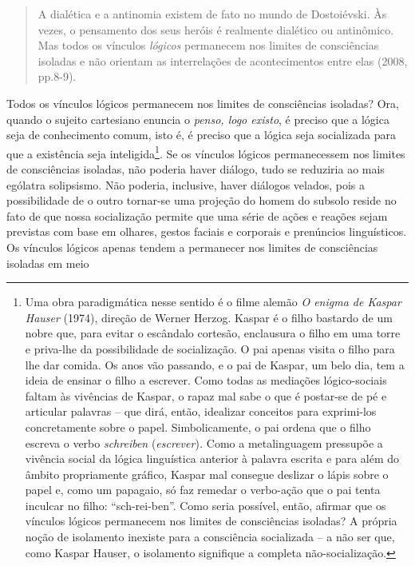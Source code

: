\begin{quote}
A dialética e a antinomia existem de fato no mundo de Dostoiévski. Às
vezes, o pensamento dos seus heróis é realmente dialético ou antinômico.
Mas todos os vínculos \emph{lógicos} permanecem nos limites de
consciências isoladas e não orientam as interrelações de acontecimentos
entre elas (2008, pp.8-9).
\end{quote}

Todos os vínculos lógicos permanecem nos limites de consciências
isoladas? Ora, quando o sujeito cartesiano enuncia o \emph{penso, logo
existo}, é preciso que a lógica seja de conhecimento comum, isto é, é
preciso que a lógica seja socializada para que a existência seja
inteligida\footnote{Uma obra paradigmática nesse sentido é o filme
  alemão \emph{O enigma de Kaspar Hauser} (1974), direção de Werner
  Herzog. Kaspar é o filho bastardo de um nobre que, para evitar o
  escândalo cortesão, enclausura o filho em uma torre e priva-lhe da
  possibilidade de socialização. O pai apenas visita o filho para lhe
  dar comida. Os anos vão passando, e o pai de Kaspar, um belo dia, tem
  a ideia de ensinar o filho a escrever. Como todas as mediações
  lógico-sociais faltam às vivências de Kaspar, o rapaz mal sabe o que é
  postar-se de pé e articular palavras -- que dirá, então, idealizar
  conceitos para exprimi-los concretamente sobre o papel.
  Simbolicamente, o pai ordena que o filho escreva o verbo
  \emph{schreiben} (\emph{escrever})\emph{.} Como a metalinguagem
  pressupõe a vivência social da lógica linguística anterior à palavra
  escrita e para além do âmbito propriamente gráfico, Kaspar mal
  consegue deslizar o lápis sobre o papel e, como um papagaio, só faz
  remedar o verbo-ação que o pai tenta inculcar no filho:
  ``sch-rei-ben''. Como seria possível, então, afirmar que os vínculos
  lógicos permanecem nos limites de consciências isoladas? A própria
  noção de isolamento inexiste para a consciência socializada -- a não
  ser que, como Kaspar Hauser, o isolamento signifique a completa
  não-socialização.}. Se os vínculos lógicos permanecessem nos limites
de consciências isoladas, não poderia haver diálogo, tudo se reduziria
ao mais ególatra solipsismo. Não poderia, inclusive, haver diálogos
velados, pois a possibilidade de o outro tornar-se uma projeção do homem
do subsolo reside no fato de que nossa socialização permite que uma
série de ações e reações sejam previstas com base em olhares, gestos
faciais e corporais e prenúncios linguísticos. Os vínculos lógicos
apenas tendem a permanecer nos limites de consciências isoladas em meio
